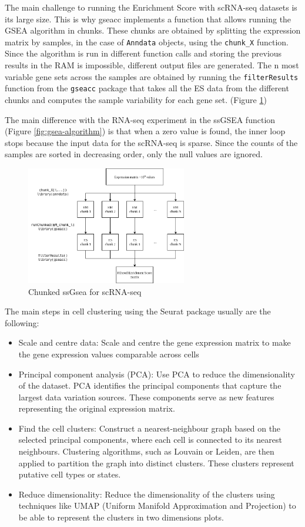 \documentclass[aps,prb,twocolumn,superscriptaddress,floatfix,longbibliography]{revtex4-2}
\newif\ifptitle
\newif\ifpnumber
\newcounter{para}
\newcommand\ptitle[1]{\par\refstepcounter{para}
{\ifpnumber{\noindent\textcolor{lightgray}{\textbf{\thepara}}\indent}\fi}
{\ifptitle{\textbf{[{#1}]}}\fi}}
\begin{document}
\ptitle{gseacc} The main challenge to running the Enrichment Score with scRNA-seq datasets is its large size. This is why gseacc implements a function that allows running the GSEA algorithm in chunks. These chunks are obtained by splitting the expression matrix by samples, in the case of \texttt{Anndata} objects, using the \texttt{chunk\_X} function. Since the algorithm is run in different function calls and storing the previous results in the RAM is impossible, different output files are generated. The n most variable gene sets across the samples are obtained by running the \texttt{filterResults} function from the \texttt{gseacc} package that takes all the ES data from the different chunks and computes the sample variability for each gene set. (Figure \ref{fig:chunkedgsea})

The main difference with the RNA-seq experiment in the ssGSEA function (Figure \ref{fig:gsea-algorithm}) is that when a zero value is found, the inner loop stops because the input data for the scRNA-seq is sparse. Since the counts of the samples are sorted in decreasing order, only the null values are ignored.


\begin{figure}[h]
\centering
\includegraphics[clip=true,width=7cm]{img/gsea-pipeline.png}
\caption{Chunked ssGsea for scRNA-seq}
\label{fig:chunkedgsea}
\end{figure}


\ptitle{Seurat \cite{seurat-v4} \cite{seurat-web}} The main steps in cell clustering using the Seurat package usually are the following:
\begin{itemize}
\item Scale and centre data: Scale and centre the gene expression matrix to make the gene expression values comparable across cells
\item Principal component analysis (PCA): Use PCA to reduce the dimensionality of the dataset. PCA identifies the principal components that capture the largest data variation sources. These components serve as new features representing the original expression matrix.
\item Find the cell clusters: Construct a nearest-neighbour graph based on the selected principal components, where each cell is connected to its nearest neighbours. Clustering algorithms, such as Louvain or Leiden, are then applied to partition the graph into distinct clusters. These clusters represent putative cell types or states.
\item Reduce dimensionality: Reduce the dimensionality of the clusters using techniques like UMAP (Uniform Manifold Approximation and Projection) to be able to represent the clusters in two dimensions plots.
\end{itemize}
\end{document}

